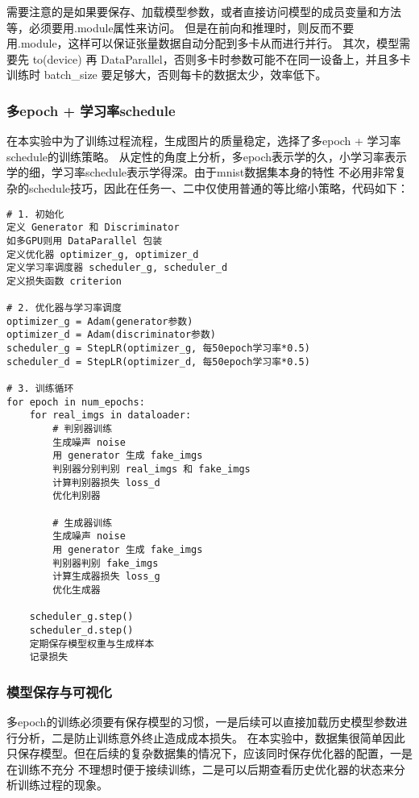\documentclass[12pt, a4paper]{article}
\begin{document}
需要注意的是如果要保存、加载模型参数，或者直接访问模型的成员变量和方法等，必须要用.module属性来访问。
但是在前向和推理时，则反而不要用.module，这样可以保证张量数据自动分配到多卡从而进行并行。
其次，模型需要先 to(device) 再 DataParallel，否则多卡时参数可能不在同一设备上，并且多卡训练时
 batch\_size 要足够大，否则每卡的数据太少，效率低下。

\newpage
\subsubsection{多epoch + 学习率schedule}
在本实验中为了训练过程流程，生成图片的质量稳定，选择了多epoch + 学习率schedule的训练策略。
从定性的角度上分析，多epoch表示学的久，小学习率表示学的细，学习率schedule表示学得深。由于mnist数据集本身的特性
不必用非常复杂的schedule技巧，因此在任务一、二中仅使用普通的等比缩小策略，代码如下：
\begin{lstlisting}
# 1. 初始化
定义 Generator 和 Discriminator
如多GPU则用 DataParallel 包装
定义优化器 optimizer_g, optimizer_d
定义学习率调度器 scheduler_g, scheduler_d
定义损失函数 criterion

# 2. 优化器与学习率调度
optimizer_g = Adam(generator参数)
optimizer_d = Adam(discriminator参数)
scheduler_g = StepLR(optimizer_g, 每50epoch学习率*0.5)
scheduler_d = StepLR(optimizer_d, 每50epoch学习率*0.5)

# 3. 训练循环
for epoch in num_epochs:
    for real_imgs in dataloader:
        # 判别器训练
        生成噪声 noise
        用 generator 生成 fake_imgs
        判别器分别判别 real_imgs 和 fake_imgs
        计算判别器损失 loss_d
        优化判别器

        # 生成器训练
        生成噪声 noise
        用 generator 生成 fake_imgs
        判别器判别 fake_imgs
        计算生成器损失 loss_g
        优化生成器

    scheduler_g.step()
    scheduler_d.step()
    定期保存模型权重与生成样本
    记录损失

\end{lstlisting}


\subsubsection{模型保存与可视化}

多epoch的训练必须要有保存模型的习惯，一是后续可以直接加载历史模型参数进行分析，二是防止训练意外终止造成成本损失。
在本实验中，数据集很简单因此只保存模型。但在后续的复杂数据集的情况下，应该同时保存优化器的配置，一是在训练不充分
不理想时便于接续训练，二是可以后期查看历史优化器的状态来分析训练过程的现象。
\end{document}
